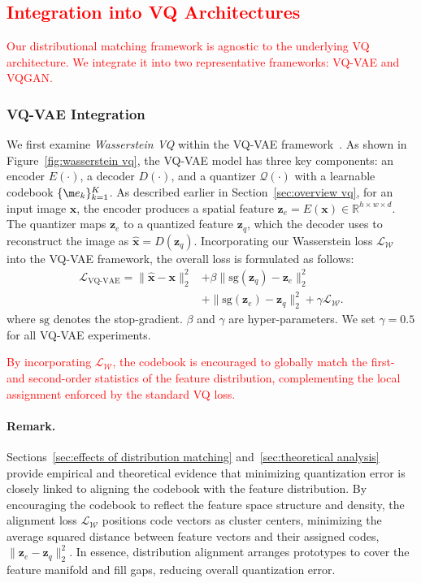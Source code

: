 \textcolor{red}{\subsection{Integration into VQ Architectures}
Our distributional matching framework is agnostic to the underlying VQ architecture. We integrate it into two representative frameworks: VQ-VAE and VQGAN.}

\subsubsection{VQ-VAE Integration} 
\label{sec:VQVAE}
We first examine \emph{Wasserstein VQ} within the VQ-VAE framework~\citep{Oord2017NeuralDR}. As shown in Figure~\ref{fig:wasserstein vq}, the VQ-VAE model has three key components: an encoder $E(\cdot)$, a decoder $D(\cdot)$, and a quantizer $\mathcal{Q}(\cdot)$ with a learnable codebook $\{\m e_k\}_{k=1}^{K}$. As described earlier in Section~\ref{sec:overview vq}, for an input image $\bm{x}$, the encoder produces a spatial feature $\bm{z}_e = E(\bm{x}) \in \mathbb{R}^{h\times w \times d}$. The quantizer maps $\bm{z}_e$ to a quantized feature $\bm{z}_q$, which the decoder uses to reconstruct the image as $\bm{\hat{x}} = D(\bm{z}_q)$. Incorporating our Wasserstein loss $\mathcal{L}_{\mathcal{W}}$ into the VQ-VAE framework, the overall loss is formulated as follows:
\begin{align}
\label{eq:vqvae}
\mathcal{L}_{\text{VQ-VAE}} =\| \bm{\hat{x}} - \bm{x} \|^{2}_2 & + \beta \| \textrm{sg}(\bm{z}_q)-\bm{z}_e \|^{2}_2 \\\nonumber
 & + \| \textrm{sg}(\bm{z}_e) -\bm{z}_q \|^{2}_2 + \gamma \mathcal{L}_{\mathcal{W}}.
\end{align} 
where $\textrm{sg}$ denotes the stop-gradient. $\beta$ and $\gamma$ are hyper-parameters. We set $\gamma=0.5$ for all VQ-VAE experiments.

\textcolor{red}{By incorporating $\mathcal{L}_{\mathcal{W}}$, the codebook is encouraged to globally match the first- and second-order statistics of the feature distribution, complementing the local assignment enforced by the standard VQ loss.}

\paragraph{Remark.} 
Sections~\ref{sec:effects of distribution matching} and~\ref{sec:theoretical analysis} provide empirical and theoretical evidence that minimizing quantization error is closely linked to aligning the codebook with the feature distribution. By encouraging the codebook to reflect the feature space structure and density, the alignment loss $\mathcal{L}_{\mathcal{W}}$ positions code vectors as cluster centers, minimizing the average squared distance between feature vectors and their assigned codes, $\| \bm{z}_e - \bm{z}_q \|^{2}_2$. In essence, distribution alignment arranges prototypes to cover the feature manifold and fill gaps, reducing overall quantization error.


